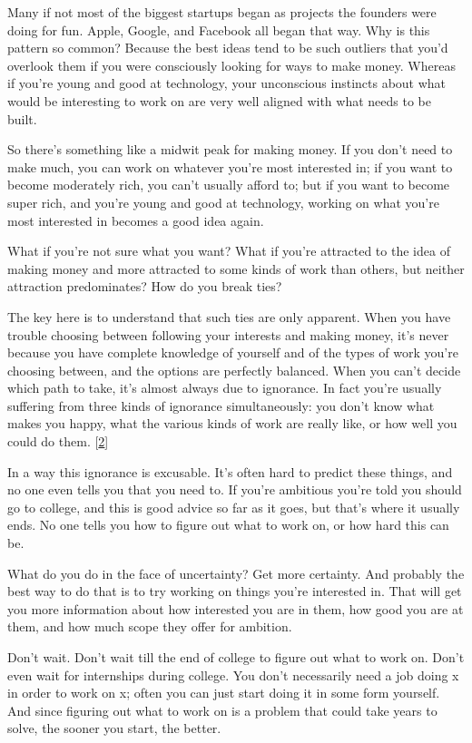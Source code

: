 Many if not most of the biggest startups began as projects the founders
were doing for fun. Apple, Google, and Facebook all began that way. Why
is this pattern so common? Because the best ideas tend to be such
outliers that you'd overlook them if you were consciously looking for
ways to make money. Whereas if you're young and good at technology, your
unconscious instincts about what would be interesting to work on are
very well aligned with what needs to be built.

So there's something like a midwit peak for making money. If you don't
need to make much, you can work on whatever you're most interested in;
if you want to become moderately rich, you can't usually afford to; but
if you want to become super rich, and you're young and good at
technology, working on what you're most interested in becomes a good
idea again.

What if you're not sure what you want? What if you're attracted to the
idea of making money and more attracted to some kinds of work than
others, but neither attraction predominates? How do you break ties?

The key here is to understand that such ties are only apparent. When you
have trouble choosing between following your interests and making money,
it's never because you have complete knowledge of yourself and of the
types of work you're choosing between, and the options are perfectly
balanced. When you can't decide which path to take, it's almost always
due to ignorance. In fact you're usually suffering from three kinds of
ignorance simultaneously: you don't know what makes you happy, what the
various kinds of work are really like, or how well you could do them.
{[}\hyperref[f2n]{2}{]}

In a way this ignorance is excusable. It's often hard to predict these
things, and no one even tells you that you need to. If you're ambitious
you're told you should go to college, and this is good advice so far as
it goes, but that's where it usually ends. No one tells you how to
figure out what to work on, or how hard this can be.

What do you do in the face of uncertainty? Get more certainty. And
probably the best way to do that is to try working on things you're
interested in. That will get you more information about how interested
you are in them, how good you are at them, and how much scope they offer
for ambition.

Don't wait. Don't wait till the end of college to figure out what to
work on. Don't even wait for internships during college. You don't
necessarily need a job doing x in order to work on x; often you can just
start doing it in some form yourself. And since figuring out what to
work on is a problem that could take years to solve, the sooner you
start, the better.

